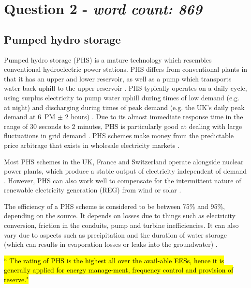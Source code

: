 \section{Question 2 - \textit{word count: 869}}



\subsection{Pumped hydro storage}

Pumped hydro storage (PHS) is a mature technology which resembles conventional hydroelectric power stations.
PHS differs from conventional plants in that it has an upper and lower reservoir, as well as a pump which transports water back uphill to the upper reservoir \citep{Kocher-Oberlehner2014, ScotsRenewables2011}.
PHS typically operates on a daily cycle, using surplus electricity to pump water uphill during times of low demand (e.g. at night) and discharging during times of peak demand (e.g. the UK's daily peak demand at 6~PM $\pm$ 2 hours) \citep{Mearns2018, Kocher-Oberlehner2014, ScotsRenewables2011}.
Due to its almost immediate response time in the range of 30 seconds to 2 minutes, PHS is particularly good at dealing with large fluctuations in grid demand \citep{ScotsRenewables2011, ESMStudy2010}.
PHS schemes make money from the predictable price arbitrage that exists in wholesale electricity markets \citep{Mearns2018, Strathclyde2004}.

Most PHS schemes in the UK, France and Switzerland operate alongside nuclear power plants, which produce a stable output of electricity independent of demand \citep{Mearns2018, Kocher-Oberlehner2014}.
However, PHS can also work well to compensate for the intermittent nature of renewable electricity generation (REG) from wind or solar \citep{Kocher-Oberlehner2014}.

The efficiency of a PHS scheme is considered to be between 75\% and 95\%, depending on the source.
It depends on losses due to things such as electricity conversion, friction in the conduits, pump and turbine inefficiencies.
It can also vary due to aspects such as precipitation and the duration of water storage (which can results in evaporation losses or leaks into the groundwater) \citep{WillsComment2015, Kocher-Oberlehner2014}.

\hl{``
	The rating of PHS is the highest all over the avail-able EESs, hence it is generally applied for energy manage-ment, frequency control and provision of reserve."} \citep{Chen2009}

